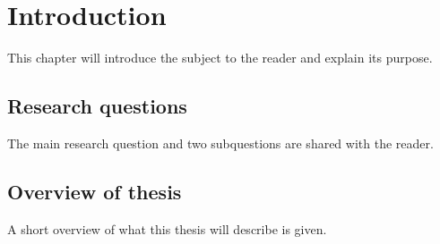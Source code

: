 \chapter{Introduction}
\label{chapter:introduction}
This chapter will introduce the subject to the reader and explain its purpose.

\section{Research questions}
\label{section:researchquestions}
The main research question and two subquestions are shared with the reader.

\section{Overview of thesis}
\label{section:overviewofthesis}
A short overview of what this thesis will describe is given.

